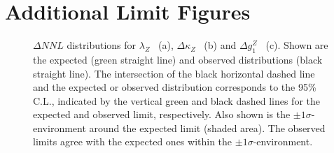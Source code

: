 \section{Additional Limit Figures}

\begin{figure}
	\centering
	\caption[Delta-log-likelihood distributions for the three aTGC parameters in vertex parametrization]{$\Delta NNL$ distributions for $\lambda_Z$ \ (a), $\Delta \kappa_Z$ \ (b) and $\Delta g_1^Z$ \ (c). Shown are the expected (green straight line) and observed distributions (black straight line). The intersection of the black horizontal dashed line and the expected or observed distribution corresponds to the 95\% C.L., indicated by the vertical green and black dashed lines for the expected and observed limit, respectively. Also shown is the $\pm 1\sigma$-environment around the expected limit (shaded area). The observed limits agree with the expected ones within the $\pm 1\sigma$-environment.}
\end{figure}

